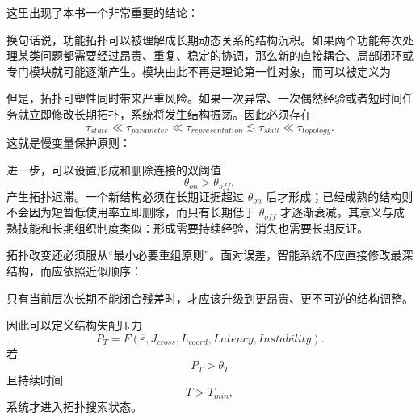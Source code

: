 这里出现了本书一个非常重要的结论：
\begin{statementbox}
\centering
{}
\end{statementbox}
换句话说，功能拓扑可以被理解成长期动态关系的结构沉积。如果两个功能每次处理某类问题都需要经过昂贵、重复、稳定的协调，那么新的直接耦合、局部闭环或专门模块就可能逐渐产生。模块由此不再是理论第一性对象，而可以被定义为
\begin{statementbox}
\centering
{}
\end{statementbox}

但是，拓扑可塑性同时带来严重风险。如果一次异常、一次偶然经验或者短时间任务就立即修改长期拓扑，系统将发生结构振荡。因此必须存在
\begin{equation}
\tau_{state}
\ll
\tau_{parameter}
\ll
\tau_{representation}
\lesssim
\tau_{skill}
\ll
\tau_{topology}.
\end{equation}
这就是慢变量保护原则：
\begin{statementbox}
\centering
{}
\end{statementbox}

进一步，可以设置形成和删除连接的双阈值
\begin{equation}
\theta_{on}
>
\theta_{off},
\end{equation}
产生拓扑迟滞。一个新结构必须在长期证据超过 $\theta_{on}$ 后才形成；已经成熟的结构则不会因为短暂低使用率立即删除，而只有长期低于 $\theta_{off}$ 才逐渐衰减。其意义与成熟技能和长期组织制度类似：形成需要持续经验，消失也需要长期反证。

拓扑改变还必须服从“最小必要重组原则”。面对误差，智能系统不应直接修改最深结构，而应依照近似顺序：
\begin{statementbox}
\centering
{}
\end{statementbox}
只有当前层次长期不能闭合残差时，才应该升级到更昂贵、更不可逆的结构调整。

因此可以定义结构失配压力
\begin{equation}
P_T
=
F
\left(
\overline{\varepsilon},
J_{cross},
L_{coord},
Latency,
Instability
\right).
\end{equation}
若
\begin{equation}
P_T>\theta_T
\end{equation}
且持续时间
\begin{equation}
T>T_{min},
\end{equation}
系统才进入拓扑搜索状态。

